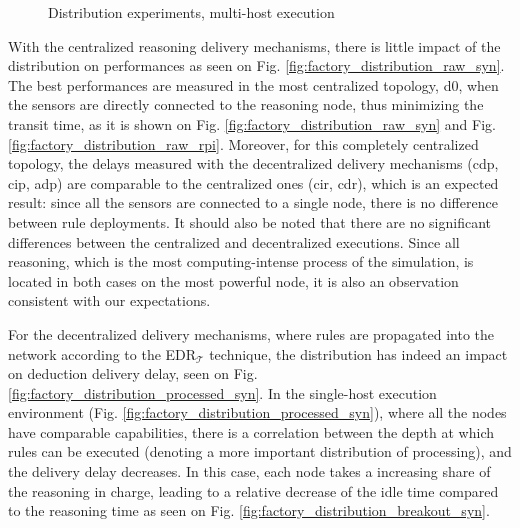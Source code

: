 \documentclass{iosart2c}
\newcommand{\edrt}{EDR$_{\mathcal{T}}$\xspace}
\begin{document}
\begin{figure}
	\Centering
	\caption{\Centering Distribution experiments, multi-host execution}
	\label{fig:factory_distribution_multi-host}
	
	\begin{minipage}{0.395\textwidth}
		\Centering
		\label{fig:factory_distribution_raw_rpi}
		\scalebox{0.8}{
			
		}
	\end{minipage}
	\begin{minipage}{0.595\textwidth}
		\Centering
		\label{fig:factory_distribution_processed_rpi}
		\scalebox{0.8}{
			
		}
	\end{minipage}
\end{figure}

With the centralized reasoning delivery mechanisms, there is little impact of the distribution on performances as seen on Fig. \ref{fig:factory_distribution_raw_syn}.
The best performances are measured in the most centralized topology, d0, when the sensors are directly connected to the reasoning node, thus minimizing the transit time, as it is shown on Fig. \ref{fig:factory_distribution_raw_syn} and Fig. \ref{fig:factory_distribution_raw_rpi}.
Moreover, for this completely centralized topology, the delays measured with the decentralized delivery mechanisms (\gls{cdp}, \gls{cip}, \gls{adp}) are comparable to the centralized ones (\gls{cir}, \gls{cdr}), which is an expected result: since all the sensors are connected to a single node, there is no difference between rule deployments.
It should also be noted that there are no significant differences between the centralized and decentralized executions.
Since all reasoning, which is the most computing-intense process of the simulation, is located in both cases on the most powerful node, it is also an observation consistent with our expectations.

For the decentralized delivery mechanisms, where rules are propagated into the network according to the \edrt technique, the distribution has indeed an impact on deduction delivery delay, seen on Fig. \ref{fig:factory_distribution_processed_syn}.
In the single-host execution environment (Fig. \ref{fig:factory_distribution_processed_syn}), where all the nodes have comparable capabilities, there is a correlation between the depth at which rules can be executed (denoting a more important distribution of processing), and the delivery delay decreases.
In this case, each node takes a increasing share of the reasoning in charge, leading to a relative decrease of the idle time compared to the reasoning time as seen on Fig. \ref{fig:factory_distribution_breakout_syn}.
\end{document}
